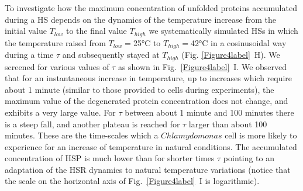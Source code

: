 \documentclass[oneside, 10pt, a4paper, twocolumn]{article}
\begin{document}

To investigate how the maximum concentration of unfolded proteins accumulated during a HS depends on the dynamics of the  temperature increase from the initial value $T_{low}$ to the final value $T_{high}$ we systematically simulated HSs in which the temperature raised from $T_{low}=$25°C to $T_{high}=$42°C in a cosinusoidal way during a time  $\tau$ and subsequently stayed at $T_{high}$ (Fig. \ref{Figure4label}~H). 
We screened for various values of   $\tau$ as shown  in Fig.~\ref{Figure4label}~I. We observed that for an instantaneous increase in temperature, up to increases which require about 1 minute (similar to those provided to cells during experiments), the maximum value of the degenerated protein concentration  does not change, and exhibits a very large value. For $\tau$ between about 1 minute and 100 minutes there is a steep fall, and another plateau is reached for $\tau$ larger than about 100 minutes. These are the time-scales which a $Chlamydomonas$ cell is more likely to experience for an increase of temperature in natural conditions. The accumulated concentration of HSP is much lower than for shorter times $\tau$ pointing to an adaptation of the  HSR dynamics to natural temperature variations %
(notice that the scale on the horizontal axis of Fig.~\ref{Figure4label}~I is logarithmic).
\end{document}
